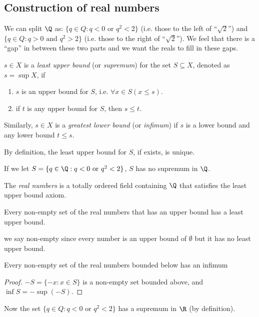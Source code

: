 \documentclass[a4paper]{article}
\begin{document}
  \subsection{Construction of real numbers}
  We can split $\Q$ as: $\{q\in Q: q < 0 \text{ or } q^2 < 2\}$ (i.e. those to the left of ``$\sqrt{2}$'') and $\{q\in Q: q > 0 \text{ and } q^2 > 2\}$ (i.e. those to the right of ``$\sqrt{2}$''). We feel that there is a ``gap'' in between these two parts and we want the reals to fill in these gaps. 

  \begin{defi}
    $s\in X$ is a \emph{least upper bound} (or \emph{supremum}) for the set $S\subseteq X$, denoted as $s = \sup X$, if
    \begin{enumerate}
      \item $s$ is an upper bound for $S$, i.e. $\forall x\in S(x \leq s)$.
      \item if $t$ is any upper bound for $S$, then $s \leq t$.
    \end{enumerate}

    Similarly, $s\in X$ is a \emph{greatest lower bound} (or \emph{infimum}) if $s$ is a lower bound and any lower bound $t \leq s$. 
  \end{defi}
  By definition, the least upper bound for $S$, if exists, is unique.

  If we let $S = \{q\in \Q: q < 0 \text{ or } q^2 < 2\}$, $S$ has no supremum in $\Q$.
  \begin{defi}
    The \emph{real numbers} is a totally ordered field containing $\Q$ that satisfies the least upper bound axiom.
  \end{defi}

  \begin{axiom}
    Every non-empty set of the real numbers that has an upper bound has a least upper bound.
  \end{axiom}

  \note we say non-empty since every number is an upper bound of $\emptyset$ but it has no least upper bound.

  \begin{cor}
    Every non-empty set of the real numbers bounded below has an infimum
  \end{cor}
  \begin{proof}
    $-S = \{-x: x\in S\}$  is a non-empty set bounded above, and $\inf S = -\sup (-S)$.
  \end{proof}
  Now the set $\{q\in Q: q < 0 \text{ or } q^2 < 2\}$ has a supremum in $\R$ (by definition).
\end{document}

